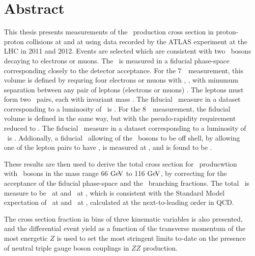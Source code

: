 \chapter*{Abstract}
This thesis presents measurements of the \ZZ\ production cross section in proton-proton collisions
at  and at  using data recorded by the ATLAS experiment 
at the LHC in 2011 and 2012.  
Events are selected which are consistent with two \Z\ bosons decaying to
electrons or muons. The \cx\ is measured in a fiducial phase-space corresponding
closely to the detector acceptance. For the 7~\tev\ measurement, this volume is
defined by requring four electrons or muons with , ,
with minumum separation between any pair of leptons (electrons or muons) . The leptons
must form two \ossf\ pairs, each with invariant mass \sstooos. The fiducial \cx\
measure in a dataset corresponding to a luminosity of
\LumiPassGRLTwentyEleven\ifb\ is \ZZSevenTeVFiducialCrossSectionZZLLLL. For the 8~\tev\ measurement, the fiducial
volume is defined in the same way, but with the pseudo-rapidity requirement
reduced to \modetalt{2.7}. The fiducial \cx\
measure in a dataset corresponding to a luminosity of
\LumiPassGRLTwentyTwelve\ifb\ is \ZZEightTeVFiducialCrossSectionZZLLLL.
Addionally, a fiducial \cx\ allowing of the \Z\ bosons to be off shell, by
allowing one of the lepton pairs to have \mllgtt, is measured at
\sqrtseq{7}, and is found to be \ZZSevenTeVFiducialCrossSectionZZsLLLL.

These results are then used to derive the total cross section for \ZZ\
producwtion with \Z\ bosons in the mass range 66$\GeV$ to 116$\GeV$, by
correcting for the acceptance of the fiducial phase-space and the \Zll\
branching fractions. The total \cx\ is measure to be
\ZZSevenTeVTotalCrossSection\ at \sqrtseq{7} and \ZZEightTeVTotalCrossSection\ at
\sqrtseq{8}, which is consistent with the Standard Model
expectation of \ZZSevenTeVTheoryTotalCrossSection\ at \sqrtseq{7} and \ZZEightTeVTheoryTotalCrossSection\ at
\sqrtseq{8}, calculated at the next-to-leading order in QCD.

The cross section fraction in bins of three kinematic variables is also presented, and 
the differential event yield as a function of the transverse momentum of the most energetic $Z$ 
is used to set the most stringent limits to-date on the presence of 
neutral triple gauge boson couplings in $ZZ$ production.

